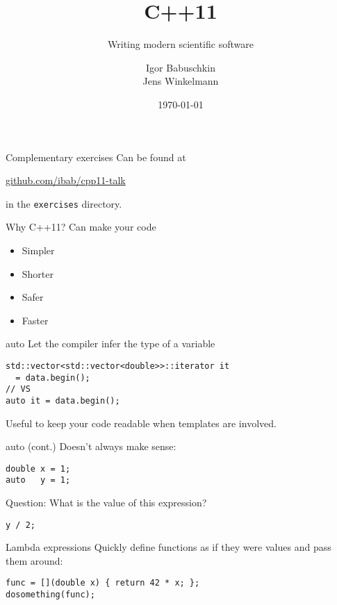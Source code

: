 \documentclass[compress,aspectratio=43]{beamer}
\title{C++11}
\subtitle{Writing modern scientific software}
\date{\today}
\author{Igor Babuschkin\\ Jens Winkelmann}
\begin{document}
\maketitle

\begin{frame}{Complementary exercises}
  Can be found at \\
  \begin{center}
  \url{github.com/ibab/cpp11-talk}
  \end{center}
  in the \texttt{exercises} directory.
\end{frame}

\begin{frame}{Why C++11?}
  Can make your code
  \begin{itemize}
    \item Simpler
    \item Shorter
    \item Safer
    \item Faster
  \end{itemize}
\end{frame}

\begin{frame}[fragile]{auto}
  Let the compiler infer the type of a variable
  \begin{verbatim}
std::vector<std::vector<double>>::iterator it
  = data.begin();
// VS
auto it = data.begin();
  \end{verbatim}
  Useful to keep your code readable when templates are involved.
\end{frame}

\begin{frame}[fragile]{auto (cont.)}
  Doesn't always make sense:
  \begin{verbatim}
double x = 1;
auto   y = 1;
  \end{verbatim}
  Question: What is the value of this expression?
  \begin{verbatim}
y / 2;
  \end{verbatim}
\end{frame}

\begin{frame}[fragile]{Lambda expressions}
  Quickly define functions as if they were values and pass them around:
  \begin{verbatim}
func = [](double x) { return 42 * x; };
dosomething(func);
  \end{verbatim}
\end{frame}
\end{document}
